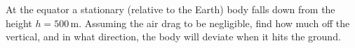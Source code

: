 \item At the equator a stationary (relative to the Earth) body falls down from the height \( h = 500 \, \text{m} \). Assuming the air drag to be negligible, find how much off the vertical, and in what direction, the body will deviate when it hits the ground.
\begin{solution}
\end{solution}
